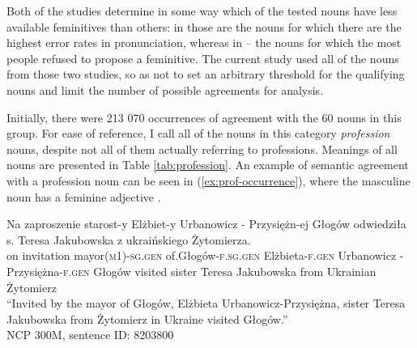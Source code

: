 Both of the studies determine in some way which of the tested nouns have less available feminitives than others: in \cite{szpyra-kozlowska_czy_2022} those are the nouns for which there are the highest error rates in pronunciation, whereas in \cite{szpyra-kozlowska_premiera_2019} -- the nouns for which the most people refused to propose a feminitive. The current study used all of the nouns from those two studies, so as not to set an arbitrary threshold for the qualifying nouns and limit the number of possible agreements for analysis.

Initially, there were 213 070 occurrences of agreement with the 60 nouns in this group. For ease of reference, I call all of the nouns in this category \textsl{profession} nouns, despite not all of them actually referring to professions. Meanings of all nouns are presented in Table \ref{tab:profession}. An example of semantic agreement with a profession noun can be seen in (\ref{ex:prof-occurrence}), where the masculine noun  has a feminine adjective .

\begin{exe}
  \ex\label{ex:prof-occurrence}
  \gll Na zaproszenie starost-y  Elżbiet-y Urbanowicz - Przysiężn-ej Głogów odwiedziła s. Teresa Jakubowska z ukraińskiego Żytomierza.\\
  on invitation mayor\textsc{(m1)-sg.gen} of.Głogów\textsc{-f.sg.gen} Elżbieta\textsc{-f.gen} Urbanowicz - Przysiężna\textsc{-f.gen} Głogów visited sister Teresa Jakubowska from Ukrainian Żytomierz\\
  \glt ``Invited by the mayor of Głogów, Elżbieta Urbanowicz-Przysiężna, sister Teresa Jakubowska from Żytomierz in Ukraine visited Głogów.''\\
  NCP 300M, sentence ID: 8203800
\end{exe}

